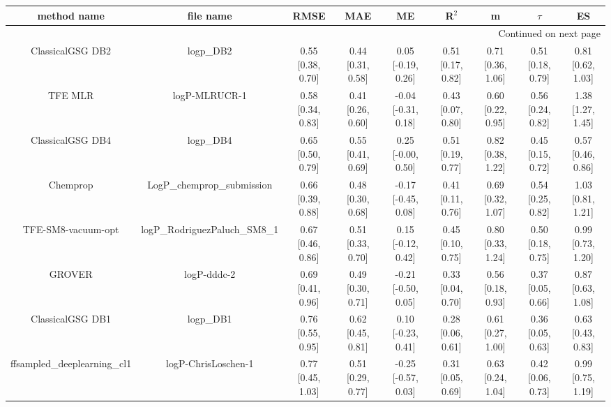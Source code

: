 \documentclass{article}
\begin{document}
\begin{center}
\scriptsize
\begin{longtable}{|ccccccccc|}
\toprule
                  method name &                                      file name &               RMSE &                MAE &                    ME &              R$^2$ &                     m &                $\tau$ &                    ES \\
\midrule
\endhead
\midrule
\multicolumn{9}{r}{{Continued on next page}} \\
\midrule
\endfoot

\bottomrule
\endlastfoot
             ClassicalGSG DB2 &                                      logp\_DB2 &  0.55 [0.38, 0.70] &  0.44 [0.31, 0.58] &    0.05 [-0.19, 0.26] &  0.51 [0.17, 0.82] &     0.71 [0.36, 1.06] &     0.51 [0.18, 0.79] &     0.81 [0.62, 1.03] \\
                      TFE MLR &                                  logP-MLRUCR-1 &  0.58 [0.34, 0.83] &  0.41 [0.26, 0.60] &   -0.04 [-0.31, 0.18] &  0.43 [0.07, 0.80] &     0.60 [0.22, 0.95] &     0.56 [0.24, 0.82] &     1.38 [1.27, 1.45] \\
             ClassicalGSG DB4 &                                      logp\_DB4 &  0.65 [0.50, 0.79] &  0.55 [0.41, 0.69] &    0.25 [-0.00, 0.50] &  0.51 [0.19, 0.77] &     0.82 [0.38, 1.22] &     0.45 [0.15, 0.72] &     0.57 [0.46, 0.86] \\
                     Chemprop &                     LogP\_chemprop\_submission &  0.66 [0.39, 0.88] &  0.48 [0.30, 0.68] &   -0.17 [-0.45, 0.08] &  0.41 [0.11, 0.76] &     0.69 [0.32, 1.07] &     0.54 [0.25, 0.82] &     1.03 [0.81, 1.21] \\
           TFE-SM8-vacuum-opt &                  logP\_RodriguezPaluch\_SM8\_1 &  0.67 [0.46, 0.86] &  0.51 [0.33, 0.70] &    0.15 [-0.12, 0.42] &  0.45 [0.10, 0.75] &     0.80 [0.33, 1.24] &     0.50 [0.18, 0.75] &     0.99 [0.73, 1.20] \\
                       GROVER &                                    logP-dddc-2 &  0.69 [0.41, 0.96] &  0.49 [0.30, 0.71] &   -0.21 [-0.50, 0.05] &  0.33 [0.04, 0.70] &     0.56 [0.18, 0.93] &     0.37 [0.05, 0.66] &     0.87 [0.63, 1.08] \\
             ClassicalGSG DB1 &                                      logp\_DB1 &  0.76 [0.55, 0.95] &  0.62 [0.45, 0.81] &    0.10 [-0.23, 0.41] &  0.28 [0.06, 0.61] &     0.61 [0.27, 1.00] &     0.36 [0.05, 0.63] &     0.63 [0.43, 0.83] \\
   ffsampled_deeplearning_cl1 &                            logP-ChrisLoschen-1 &  0.77 [0.45, 1.03] &  0.51 [0.29, 0.77] &   -0.25 [-0.57, 0.03] &  0.31 [0.05, 0.69] &     0.63 [0.24, 1.04] &     0.42 [0.06, 0.73] &     0.99 [0.75, 1.19] \\

\end{longtable}
\end{center}
\end{document}
